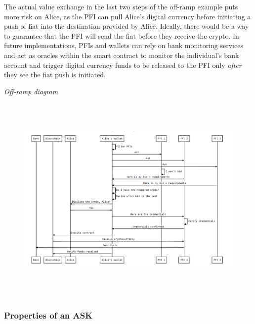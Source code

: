 \documentclass[11pt]{article}
\begin{document}
\vspace{1\baselineskip}
The actual value exchange in the last two steps of the off-ramp example puts more risk on Alice, as the PFI can pull Alice’s digital currency before initiating a push of fiat into the destination provided by Alice. \textcolor[HTML]{202124}{Ideally, there would be a way to guarantee that the PFI will send the fiat before they receive the crypto.} In future implementations, PFIs and wallets can rely on bank monitoring services and act as oracles within the smart contract to monitor the individual's bank account and trigger digital currency funds to be released to the PFI only \textit{after} they see the fiat push is initiated\textcolor[HTML]{3C4043}{.}

\vspace{9\baselineskip}
\begin{center}
\textit{\textcolor[HTML]{3C4043}{Off-ramp diagram}}
\end{center}


\vspace{1\baselineskip}
\textcolor[HTML]{3C4043}{\begin{figure}[H]
\includegraphics[width=15.48cm,height=10.29cm]{./diagrams/off-ramp.png}
\end{figure}
}

\vspace{1\baselineskip}
\subsubsection{Properties of an ASK}
\end{document}
